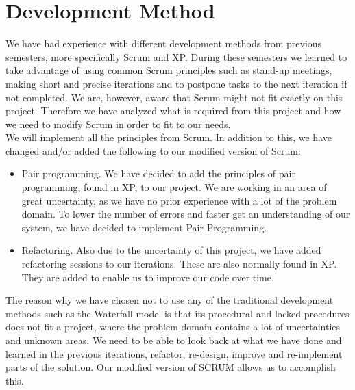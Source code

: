 \section{Development Method}
We have had experience with different development methods from previous semesters, more specifically Scrum and XP.
During these semesters we learned to take advantage of using common Scrum principles such as stand-up meetings, making short and precise iterations and to postpone tasks to the next iteration if not completed.
We are, however, aware that Scrum might not fit exactly on this project.
Therefore we have analyzed what is required from this project and how we need to modify Scrum in order to fit to our needs. \\

We will implement all the principles from Scrum. In addition to this, we have changed and/or added the following to our modified version of Scrum:
\begin{itemize}
	\item Pair programming. We have decided to add the principles of pair programming, found in XP, to our project. We are working in an area of great uncertainty, as we have no prior experience with a lot of the problem domain. To lower the number of errors and faster get an understanding of our system, we have decided to implement Pair Programming.
	\item Refactoring. Also due to the uncertainty of this project, we have added refactoring sessions to our iterations. These are also normally found in XP. They are added to enable us to improve our code over time.
\end{itemize}

The reason why we have chosen not to use any of the traditional development methods such as the Waterfall model is that its procedural and locked procedures does not fit a project, where the problem domain contains a lot of uncertainties and unknown areas. We need to be able to look back at what we have done and learned in the previous iterations, refactor, re-design, improve and re-implement parts of the solution. Our modified version of SCRUM allows us to accomplish this. 

